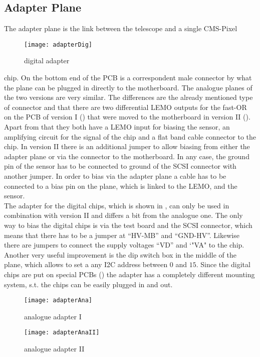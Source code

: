 \subsection{Adapter Plane}\label{s211}
The adapter plane is the link between the telescope and a single \ac{CMS}-Pixel
\begin{wrapfigure}{r}{6cm}
	\texttt{[image: adapterDig]}
	\caption{digital adapter}
	\label{p6}
\end{wrapfigure}
chip. On the bottom end of the PCB is a correspondent male connector by what the plane can be plugged in directly to the motherboard. The analogue planes of the two versions are very similar. The differences are the already mentioned type of  connector and that there are two differential LEMO outputs for the fast-OR on the PCB of version I () that were moved to the motherboard in version II (). Apart from that they both have a LEMO input for biasing the sensor, an amplifying circuit for the signal of the chip and a flat band cable connector to the chip. In version II there is an additional jumper to allow biasing from either the adapter plane or via the connector to the motherboard. In any case, the ground pin of the sensor has to be connected to ground of the SCSI connector with another jumper. In order to bias via the adapter plane a cable has to be connected to a bias pin on the plane, which is linked to the LEMO, and the sensor.\\
The adapter for the digital chips, which is shown in , can only be used in combination with version II and differs a bit from the analogue one. The only way to bias the digital chips is via the test board and the SCSI connector, which means that there has to be a jumper at ``HV-MB'' and ``GND-HV''. Likewise there are jumpers to connect the supply voltages ``VD'' and `"VA" to the chip. Another very useful improvement is the dip switch box in the middle of the plane, which allows to set a any I2C address between $0$ and $15$. Since the digital chips are put on special PCBs () the adapter has a completely different mounting system, s.t. the chips can be easily plugged in and out.
\begin{center}
	\begin{figure}
		\begin{minipage}{6cm}
			\texttt{[image: adapterAna]}
			\caption{analogue adapter I}
			\label{p4}
		\end{minipage}
		\hfill
		\begin{minipage}{6cm}
			\texttt{[image: adapterAnaII]}
			\caption{analogue adapter II}
			\label{p5}
		\end{minipage}
	\end{figure}
\end{center} 

